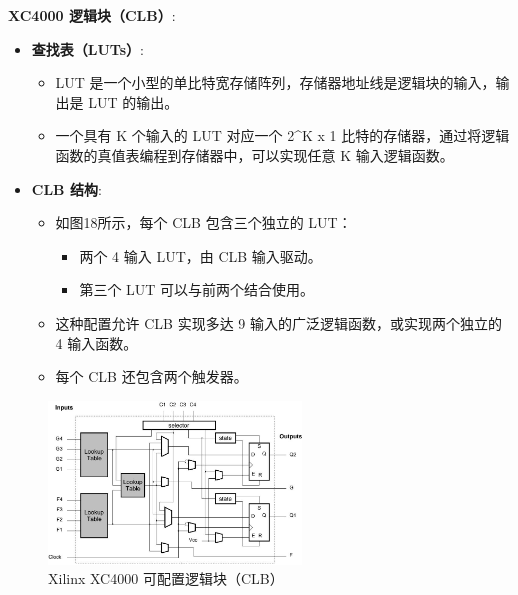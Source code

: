 \begin{frame}[allowframebreaks]{\textbf{XC4000 逻辑块（CLB）}:}
\begin{itemize}
\tightlist
\item
    \textbf{查找表（LUTs）}:

    \begin{itemize}
    \tightlist
    \item
    LUT 是一个小型的单比特宽存储阵列，存储器地址线是逻辑块的输入，输出是
    LUT 的输出。
    \item
    一个具有 K 个输入的 LUT 对应一个 2\^{}K x 1
    比特的存储器，通过将逻辑函数的真值表编程到存储器中，可以实现任意 K
    输入逻辑函数。
    \end{itemize}
\item
    \textbf{CLB 结构}:

    \begin{itemize}
    \tightlist
    \item
    如图18所示，每个 CLB 包含三个独立的 LUT：

    \begin{itemize}
    \tightlist
    \item
        两个 4 输入 LUT，由 CLB 输入驱动。
    \item
        第三个 LUT 可以与前两个结合使用。
    \end{itemize}
    \item
    这种配置允许 CLB 实现多达 9 输入的广泛逻辑函数，或实现两个独立的 4
    输入函数。
    \item
    每个 CLB 还包含两个触发器。
    \end{itemize}
\end{itemize}

\begin{figure}
    \centering
    \includegraphics[width=0.6\textwidth]{img1/XC4000.jpeg}
    \caption{Xilinx XC4000 可配置逻辑块（CLB）}
\end{figure}

\end{frame}

